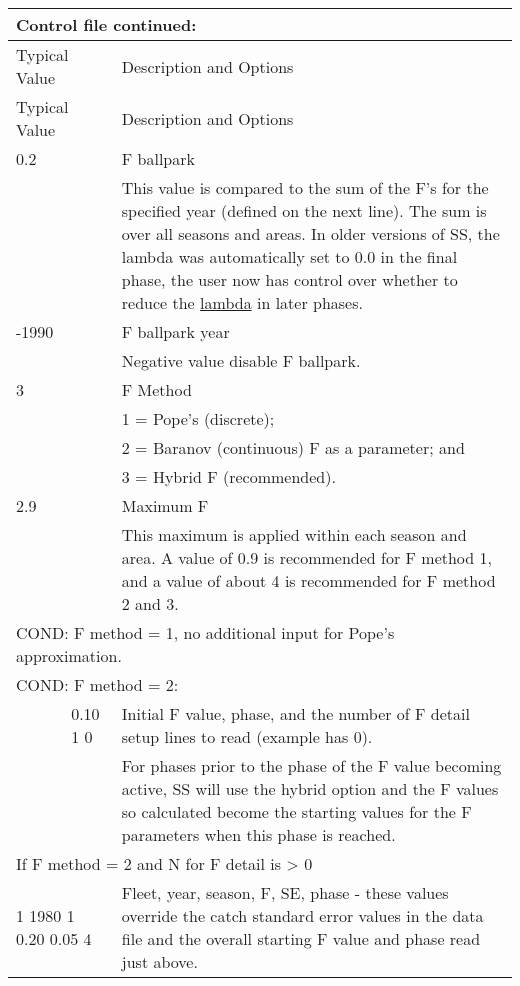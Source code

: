 \begin{longtable}{p{1cm} p{3cm} p{11cm}}
	\multicolumn{3}{l}{Control file continued:}\\
	\hline
	\multicolumn{2}{l}{Typical Value} & Description and Options\Tstrut\Bstrut\\
	\hline
	\endfirsthead

	\hline
	\multicolumn{2}{l}{Typical Value} & Description and Options\Tstrut\Bstrut\\
	\hline
	\endhead

	\hline
	\endfoot
	\endlastfoot

	0.2 \Tstrut & & F ballpark\\
	    & & This value is compared to the sum of the F's for the specified year (defined on the next line). The sum is over all seasons and areas. In older versions of SS, the lambda was automatically set to 0.0 in the final phase, the user now has control over whether to reduce the \hyperlink{Lambdas}{lambda} in later phases.\Bstrut\\
   \hline

	-1990\Tstrut & & F ballpark year\\
	      & & Negative value disable F ballpark.\Bstrut\\
   \hline

	3 \Tstrut & & F Method \\
	   & & 1 = Pope's (discrete); \\
	   & & 2 = Baranov (continuous) F as a parameter; and \\
	   & & 3 = Hybrid F (recommended).\Bstrut\\
   \hline

   2.9 \Tstrut & & Maximum F \\
       & & This maximum is applied within each season and area.   A value of 0.9 is recommended for F method 1, and a value of about 4 is recommended for F method 2 and 3. \Bstrut\\
   \hline

   \multicolumn{3}{l}{COND: F method = 1, no additional input for Pope's approximation.}\Tstrut\Bstrut\\
   \hline

   \multicolumn{3}{l}{COND: F method = 2: }\Tstrut\\
   & 0.10  1  0 & Initial F value, phase, and the number of F detail setup lines to read (example has 0). \\
   &  & For phases prior to the phase of the F value becoming active,  SS will use the hybrid option and the F values so calculated become the starting values for the F parameters when this phase is reached.\\		   
   \multicolumn{3}{l}{If F method = 2 and N for F detail is > 0}\Tstrut\\
   \multicolumn{2}{l}{1 1980 1 0.20 0.05 4} & Fleet, year, season, F, SE, phase - these values override the catch standard error values in the data file and the overall starting F value and phase read just above.\Bstrut\\
   \hline


\end{longtable}
